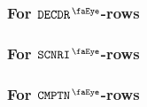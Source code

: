 \subsubsection{For $\isMxpInstructionDecoder$-rows}   \label{mxp: constraints: generalities: decoder}         
\subsubsection{For $\isMxpScenario$-rows}             \label{mxp: constraints: generalities: scenario}        
\subsubsection{For $\isMxpComputation$-rows}          \label{mxp: constraints: generalities: computation}     


